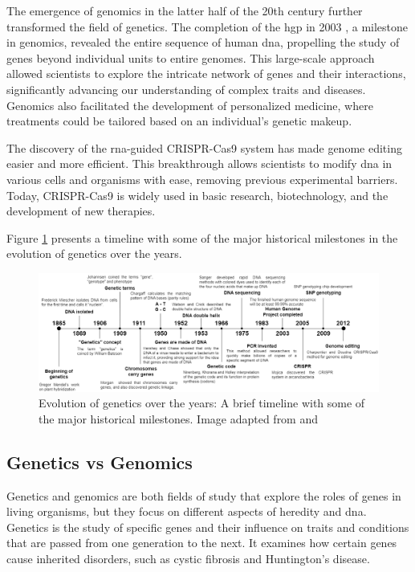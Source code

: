The emergence of genomics in the latter half of the 20th century further transformed the field of genetics. The completion of the \ac{hgp} in 2003 \cite{Collins1995}, a milestone in genomics, revealed the entire sequence of human \ac{dna}, propelling the study of genes beyond individual units to entire genomes. This large-scale approach allowed scientists to explore the intricate network of genes and their interactions, significantly advancing our understanding of complex traits and diseases. Genomics also facilitated the development of personalized medicine, where treatments could be tailored based on an individual's genetic makeup. \cite{Gayon2016}

The discovery of the \ac{rna}-guided CRISPR-Cas9 system has made genome editing easier and more efficient. This breakthrough allows scientists to modify \ac{dna} in various cells and organisms with ease, removing previous experimental barriers. Today, CRISPR-Cas9 is widely used in basic research, biotechnology, and the development of new therapies. \cite{CRISPR-CAS9}

Figure \ref{fig:timeline} presents a timeline with some of the major historical milestones in the evolution of genetics over the years.

\begin{figure}[H]
    \centering
    \includegraphics[width=1\textwidth]{figs/timeline.png}
    \caption{Evolution of genetics over the years: A brief timeline with some of the major historical milestones. Image adapted from \cite{genetictimeline} and \cite{genetictimeline2}}
    \label{fig:timeline}
\end{figure}

\subsection{Genetics vs Genomics}

Genetics and genomics are both fields of study that explore the roles of genes in living organisms, but they focus on different aspects of heredity and \ac{dna}. Genetics is the study of specific genes and their influence on traits and conditions that are passed from one generation to the next. It examines how certain genes cause inherited disorders, such as cystic fibrosis and Huntington's disease. \cite{NHGRI2018}

